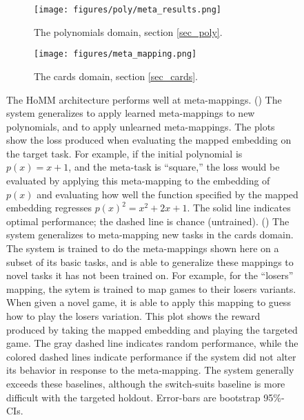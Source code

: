 \documentclass{article}
\begin{document}
\begin{figure}
\centering
\begin{subfigure}{0.5\textwidth}
\texttt{[image: figures/poly/meta\_results.png]}
\caption{The polynomials domain, section \ref{sec_poly}.}
\label{poly_meta_map_results_examples}
\end{subfigure}%
\begin{subfigure}{0.5\textwidth}
\texttt{[image: figures/meta\_mapping.png]}
\caption{The cards domain, section \ref{sec_cards}.}
\label{cards_meta_map_results_examples}
\end{subfigure}%
\caption{The HoMM architecture performs well at meta-mappings. () The system generalizes to apply learned meta-mappings to new polynomials, and to apply unlearned meta-mappings. The plots show the loss produced when evaluating the mapped embedding on the target task. For example, if the initial polynomial is $p(x) = x + 1$, and the meta-task is ``square,'' the loss would be evaluated by applying this meta-mapping to the embedding of $p(x)$ and evaluating how well the function specified by the mapped embedding regresses $p(x)^2 = x^2 + 2x + 1$. The solid line indicates optimal performance; the dashed line is chance (untrained).
() The system generalizes to meta-mapping new tasks in the cards domain. The system is trained to do the meta-mappings shown here on a subset of its basic tasks, and is able to generalize these mappings to novel tasks it has not been trained on. For example, for the ``losers'' mapping, the sytem is trained to map games to their losers variants. When given a novel game, it is able to apply this mapping to guess how to play the losers variation. This plot shows the reward produced by taking the mapped embedding and playing the targeted game. The gray dashed line indicates random performance, while the colored dashed lines indicate performance if the system did not alter its behavior in response to the meta-mapping. The system generally exceeds these baselines, although the switch-suits baseline is more difficult with the targeted holdout. 
Error-bars are bootstrap 95\%-CIs.} 
\label{meta_map_results}
\end{figure}
\end{document}
